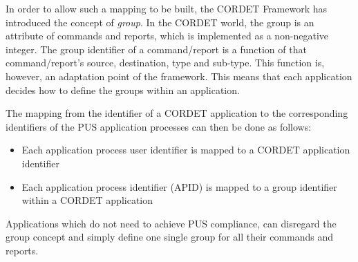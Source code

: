 In order to allow such a mapping to be built, the CORDET Framework has introduced the concept of \textit{group}. In the CORDET world, the group is an attribute of commands and reports, which is implemented as a non-negative integer. The group identifier of a command/report is a function of that command/report's source, destination, type and sub-type. This function is, however, an adaptation point of the framework. This means that each application decides how to define the groups within an application. 

The mapping from the identifier of a CORDET application to the corresponding identifiers of the PUS application processes can then be done as follows:

\begin{itemize}
\item Each application process user identifier is mapped to a CORDET application identifier
\item Each application process identifier (APID) is mapped to a group identifier within a CORDET application 
\end{itemize}

Applications which do not need to achieve PUS compliance, can disregard the group concept and simply define one single group for all their commands and reports.